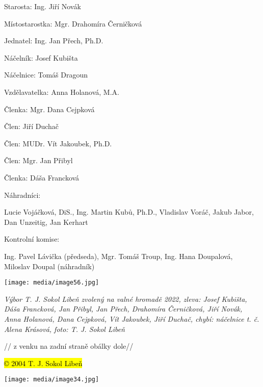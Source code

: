 Starosta: Ing. Jiří Novák

Místostarostka: Mgr. Drahomíra Černičková

Jednatel: Ing. Jan Přech, Ph.D.

Náčelník: Josef Kubišta

Náčelnice: Tomáš Dragoun

Vzdělavatelka: Anna Holanová, M.A.

Členka: Mgr. Dana Cejpková

Člen: Jiří Duchač

Člen: MUDr. Vít Jakoubek, Ph.D.

Člen: Mgr. Jan Přibyl

Členka: Dáša Francková

Náhradníci:

Lucie Vojáčková, DiS., Ing. Martin Kubů, Ph.D., Vladislav Voráč, Jakub
Jabor, Dan Unzeitig, Jan Kerhart

Kontrolní komise:

Ing. Pavel Lávička (předseda), Mgr. Tomáš Troup, Ing. Hana Doupalová,
Miloslav Doupal (náhradník)

\texttt{[image: media/image56.jpg]}

\emph{Výbor T. J. Sokol Libeň zvolený na valné hromadě 2022, zleva:
Josef Kubišta, Dáša Francková, Jan Přibyl, Jan Přech, Drahomíra
Černičková, Jiří Novák, Anna Holanová, Dana Cejpková, Vít Jakoubek, Jiří
Duchač, chybí: náčelnice t. č. Alena Krásová, foto: T. J. Sokol Libeň}

// z venku na zadní straně obálky dole//

\hl{© 2004 T. J. Sokol Libeň}

\texttt{[image: media/image34.jpg]}
